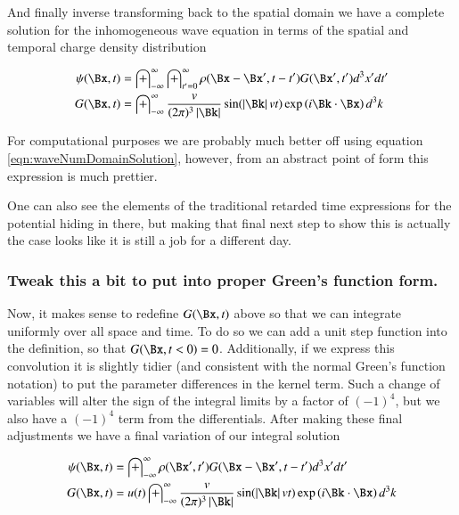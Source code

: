 \documentclass{article}
\newcommand{\IIinf}[0]{ \int_{-\infty}^\infty }
\begin{document}
And finally inverse transforming back to the spatial domain we have a complete solution for the inhomogeneous wave equation in terms of the spatial and temporal charge density distribution

\begin{align}
{\psi}(\Bx, t)
&= \IIinf \int_{t' = 0}^\infty \rho(\Bx -\Bx', t-t') G(\Bx', t') d^3 x' dt' \\
G(\Bx, t)
&= \IIinf
\frac{v}{(2\pi)^3 \Abs{\Bk}}
\sin( \Abs{\Bk} v t )
\exp\left( i \Bk \cdot \Bx \right)
d^3 k
\end{align}

For computational purposes we are probably much better off using
equation \ref{eqn:waveNumDomainSolution}, however,
from an abstract point of form this expression is much prettier.

One can also see the elements of the traditional retarded time expressions for the potential hiding in there, but making that final next step to show this is actually
the case looks like it is
still a job for a different day.

\subsubsection{ Tweak this a bit to put into proper Green's function form. }

Now, it makes sense to redefine $G(\Bx,t)$ above so that we can integrate
uniformly over all space and time.  To do so we can add a unit step function
into the definition, so that $G(\Bx,t<0) = 0$.
Additionally, if we express this convolution it is slightly tidier (and consistent with the normal Green's function notation)
to put the parameter differences in the kernel term.  Such a change of variables will alter the sign of the integral limits
by a factor of $(-1)^4$, but we also have a $(-1)^4$ term from the differentials.  After making these final adjustments
we have a final variation of our integral solution

%
% 
%
%
% 
% 
\begin{align}
{\psi}(\Bx, t)
&= \IIinf \rho(\Bx', t') G(\Bx - \Bx', t - t') d^3 x' dt' \\
G(\Bx, t)
&= u(t) \IIinf
\frac{v}{(2\pi)^3 \Abs{\Bk}}
\sin( \Abs{\Bk} v t )
\exp\left( i \Bk \cdot \Bx \right)
d^3 k
\end{align}
\end{document}

